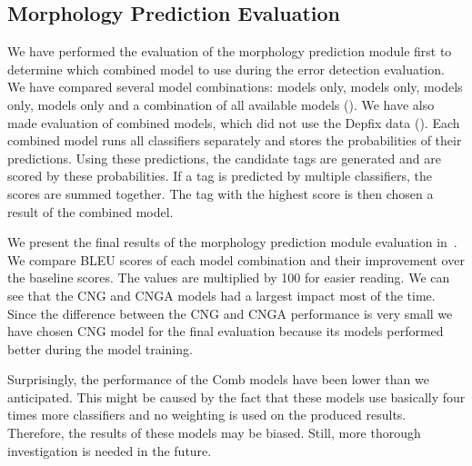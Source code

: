 \subsection{Morphology Prediction Evaluation}

We have performed the evaluation of the morphology prediction module first to determine
which combined model to use during the error detection evaluation. We have compared
several model combinations:  models only,  models only,  models only, 
 models only and a combination of all available models (). We have also
made evaluation of combined models, which did not use the Depfix data ().
Each combined model runs all classifiers separately and stores the probabilities of their
predictions. Using these predictions, the candidate tags are generated and are scored by 
these probabilities. If a tag is predicted by multiple classifiers, the scores are summed together.
The tag with the highest score is then chosen a result of the combined model.

We present the final results of the morphology prediction module evaluation in~.
We compare BLEU scores of each model combination and their improvement over the baseline scores.
The values are multiplied by 100 for easier reading. We can see that the CNG
and CNGA models had a largest impact most of the time. Since the difference between the CNG and CNGA
performance is very small we have chosen CNG model for the final evaluation because its models
performed better during the model training.

Surprisingly, the performance of the Comb models have been lower than we anticipated. This might be caused
by the fact that these models use basically four times more classifiers and no weighting is used
on the produced results. Therefore, the results of these models may be biased. Still, more thorough
investigation is needed in the future.

